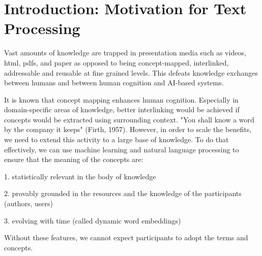 \section{Introduction: Motivation for Text Processing}

Vast amounts of knowledge are trapped in presentation media such as videos, html, pdfs, and paper as opposed to being concept-mapped, interlinked, addressable and reusable at fine grained levels. This defeats knowledge exchanges between humans and between human cognition and AI-based systems.

It is known that concept mapping enhances human cognition. Especially in domain-specific areas of knowledge, better interlinking would be achieved if concepts would be extracted using surrounding context. "You shall know a word by the company it keeps" (Firth, 1957). However, in order to scale the benefits, we need to extend this activity to a large base of knowledge. To do that effectively, we can use  machine learning and natural language processing to ensure that the meaning of the concepts are:

1. statistically relevant in the body of knowledge

2. provably grounded in the resources and the knowledge of the participants (authors, users)

3. evolving with time (called dynamic word embeddings)

Without these features, we cannot expect participants to adopt the terms and concepts.

